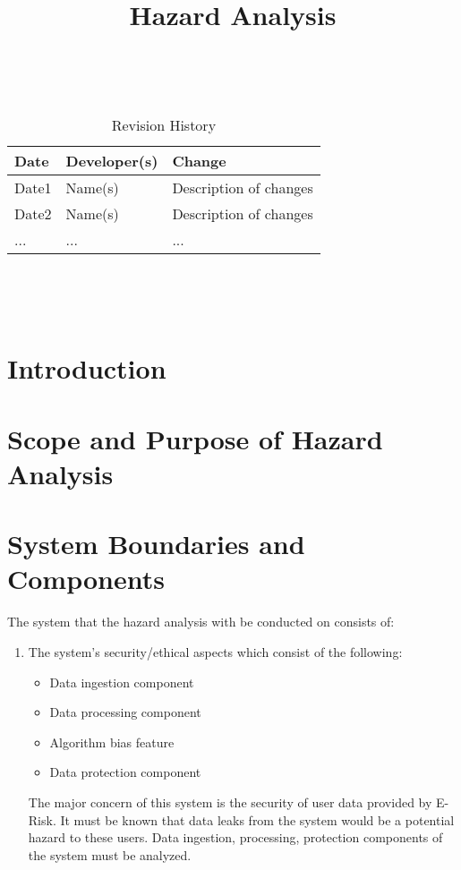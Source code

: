 \documentclass{article}
\title{Hazard Analysis\\\progname}
\author{\authname}
\date{}
\begin{document}
\maketitle
\thispagestyle{empty}

~\newpage


\begin{table}[hp]
\caption{Revision History} \label{TblRevisionHistory}
\begin{tabularx}{\textwidth}{llX}
\toprule
\textbf{Date} & \textbf{Developer(s)} & \textbf{Change}\\
\midrule
Date1 & Name(s) & Description of changes\\
Date2 & Name(s) & Description of changes\\
... & ... & ...\\
\bottomrule
\end{tabularx}
\end{table}

~\newpage

\tableofcontents

~\newpage



\section{Introduction}


\section{Scope and Purpose of Hazard Analysis}

\section{System Boundaries and Components}

The system that the hazard analysis with be conducted on consists of:
\begin{enumerate}
	\item The system's security/ethical aspects which consist of the following:
	      \begin{itemize}
		      \item Data ingestion component
		      \item Data processing component
		      \item Algorithm bias feature
		      \item Data protection component
	      \end{itemize}
	The major concern of this system is the security of user data provided by E-Risk. It must be known that data leaks from the system would be a potential hazard to these users. Data ingestion, processing, protection components of the system must be analyzed. 
\end{enumerate}
\end{document}
